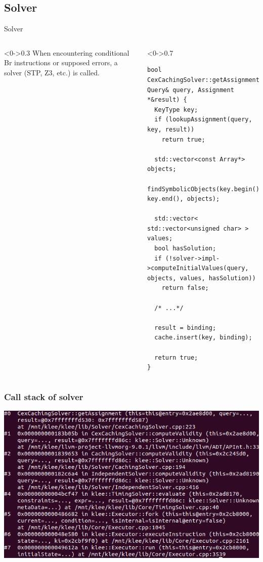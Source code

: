\documentclass[9pt,aspectratio=43,mathserif,table]{beamer}
\begin{document}
\subsection{Solver}
\begin{frame}[fragile]{Solver}
	\begin{columns}[T]
		\begin{column}<0->{0.3\textwidth}
			When encountering conditional Br instructions or supposed errors, a solver (STP, Z3, etc.) is called.
		\end{column}
		\hfill
		\begin{column}<0->{0.7\textwidth}
			\begin{lstlisting}
bool CexCachingSolver::getAssignment(const Query& query, Assignment *&result) {
  KeyType key;
  if (lookupAssignment(query, key, result))
    return true;

  std::vector<const Array*> objects;
  findSymbolicObjects(key.begin(), key.end(), objects);

  std::vector< std::vector<unsigned char> > values;
  bool hasSolution;
  if (!solver->impl->computeInitialValues(query, objects, values, hasSolution))
    return false;
    
  /* ...*/
  
  result = binding;
  cache.insert(key, binding);

  return true;
}
    \end{lstlisting}
		\end{column}
	\end{columns}
\end{frame}
\begin{frame}
	\frametitle{Call stack of solver}
	\begin{center}
		\includegraphics[width=\textwidth]{figures/STPSolverCallStack.png}
	\end{center}
\end{frame}
\end{document}
